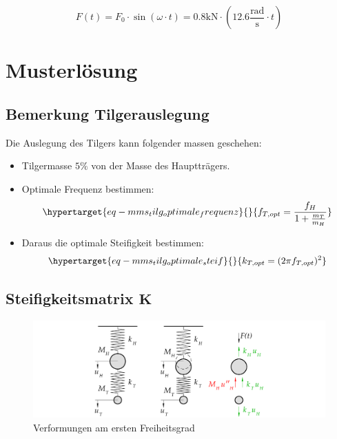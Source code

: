 \documentclass[
  letterpaper,
  DIV=11]{scrreprt}
\providecommand{\tightlist}{%
  \setlength{\itemsep}{0pt}\setlength{\parskip}{0pt}}\usepackage{longtable,booktabs,array}
\begin{document}
\[
F(t) = F_0 \cdot \sin(\omega\cdot t) = 0.8 \text{kN} \cdot (12.6 \frac{\text{rad}}{\text{s}}\cdot t)
\]

\newpage{}

\hypertarget{musterluxf6sung-9}{%
\section{Musterlösung}\label{musterluxf6sung-9}}

\hypertarget{bemerkung-tilgerauslegung}{%
\subsection{Bemerkung Tilgerauslegung}\label{bemerkung-tilgerauslegung}}

Die Auslegung des Tilgers kann folgender massen geschehen:

\begin{itemize}
\tightlist
\item
  Tilgermasse \(5\%\) von der Masse des Hauptträgers.
\item
  Optimale Frequenz bestimmen:
  \begin{equation}\protect\hypertarget{eq-mms_tilg_optimale_frequenz}{}{
  f_{T,opt} =\frac{f_H}{1+\frac{m_T}{m_H}}
  }\label{eq-mms_tilg_optimale_frequenz}\end{equation}
\item
  Daraus die optimale Steifigkeit bestimmen:
  \begin{equation}\protect\hypertarget{eq-mms_tilg_optimale_steif}{}{
  k_{T,opt} = (2 \pi f_{T,opt})^2
  }\label{eq-mms_tilg_optimale_steif}\end{equation}
\end{itemize}

\hypertarget{steifigkeitsmatrix-mathbfk}{%
\subsection{\texorpdfstring{Steifigkeitsmatrix
\(\mathbf{K}\)}{Steifigkeitsmatrix \textbackslash mathbf\{K\}}}\label{steifigkeitsmatrix-mathbfk}}

\begin{figure}[H]

{\centering \includegraphics{index_files/mediabag/bilder/aufgabe_mms_tilg_auslenk2.pdf}

}

\caption{\label{fig-mms_tilg_auslenkung_1}Verformungen am ersten
Freiheitsgrad}

\end{figure}
\end{document}
